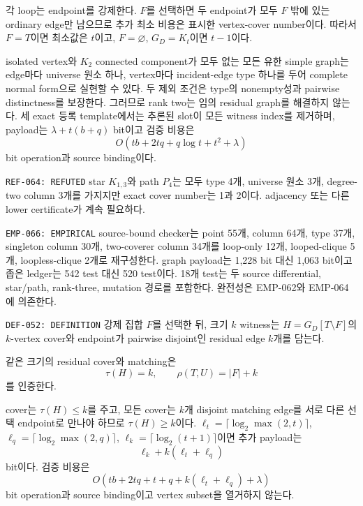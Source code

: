 \documentclass[11pt]{article}
\begin{document}
\begin{claimproof}
각 loop는 endpoint를 강제한다. \(F\)를 선택하면 두 endpoint가 모두
\(F\) 밖에 있는 ordinary edge만 남으므로 추가 최소 비용은 표시한
vertex-cover number이다. 따라서 \(F=T\)이면 최소값은 \(t\)이고,
\(F=\varnothing\), \(G_D=K_t\)이면 \(t-1\)이다.

isolated vertex와 \(K_2\) connected component가 모두 없는 모든 유한
simple graph는 edge마다 universe 원소 하나, vertex마다 incident-edge
type 하나를 두어 complete normal form으로 실현할 수 있다. 두 제외
조건은 type의 nonempty성과 pairwise distinctness를 보장한다. 그러므로
rank two는 임의 residual graph를 해결하지 않는다. 세 exact 등록
template에서는 추론된 slot이 모든 witness index를 제거하며,
payload는 \(\lambda+t(b+q)\) bit이고 검증 비용은
\[
 O(tb+2tq+q\log t+t^2+\lambda)
\]
bit operation과 source binding이다.
\end{claimproof}

{\texttt{REF-064: REFUTED}}
star \(K_{1,3}\)와 path \(P_4\)는 모두 type 4개, universe 원소 3개,
degree-two column 3개를 가지지만 exact cover number는 1과 2이다.
adjacency 또는 다른 lower certificate가 계속 필요하다.

{\texttt{EMP-066: EMPIRICAL}}
source-bound checker는 point 55개, column 64개, type 37개, singleton
column 30개, two-coverer column 34개를 loop-only 12개, looped-clique
5개, loopless-clique 2개로 재구성한다. graph payload는 1,228 bit 대신
1,063 bit이고 좁은 ledger는 542 test 대신 520 test이다. 18개 test는
두 source differential, star/path, rank-three, mutation 경로를
포함한다. 완전성은 EMP-062와 EMP-064에 의존한다.

{\texttt{DEF-052: DEFINITION}}
강제 집합 \(F\)를 선택한 뒤, 크기 \(k\) witness는
\(H=G_D[T\setminus F]\)의 \(k\)-vertex cover와 endpoint가 pairwise
disjoint인 residual edge \(k\)개를 담는다.

{}
같은 크기의 residual cover와 matching은
\[
 \tau(H)=k,\qquad \rho(T,U)=|F|+k
\]
를 인증한다.
\begin{claimproof}
cover는 \(\tau(H)\le k\)를 주고, 모든 cover는 \(k\)개 disjoint
matching edge를 서로 다른 선택 endpoint로 만나야 하므로
\(\tau(H)\ge k\)이다.
\(\ell_t=\lceil\log_2\max(2,t)\rceil\),
\(\ell_q=\lceil\log_2\max(2,q)\rceil\),
\(\ell_k=\lceil\log_2(t+1)\rceil\)이면 추가 payload는
\[
 \ell_k+k(\ell_t+\ell_q)
\]
bit이다. 검증 비용은
\[
 O(tb+2tq+t+q+k(\ell_t+\ell_q)+\lambda)
\]
bit operation과 source binding이고 vertex subset을 열거하지 않는다.
\end{claimproof}
\end{document}
